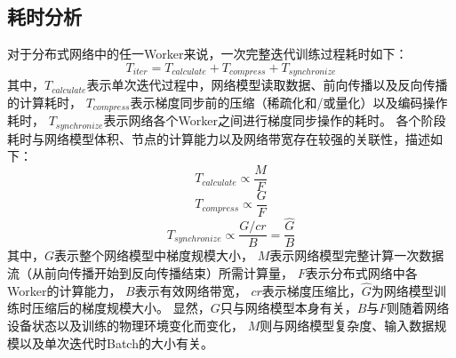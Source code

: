 \documentclass{xdupgthesis}
\begin{document}
\subsection{耗时分析}
对于分布式网络中的任一Worker来说，一次完整迭代训练过程耗时如下：
\begin{equation}
    T_{iter} = 
        T_{calculate} + T_{compress} + T_{synchronize}
    \label{eq_Time-iter}
\end{equation}
其中，$T_{calculate}$表示单次迭代过程中，网络模型读取数据、前向传播以及反向传播的计算耗时，
$T_{compress}$表示梯度同步前的压缩（稀疏化和/或量化）以及编码操作耗时，
$T_{synchronize}$表示网络各个Worker之间进行梯度同步操作的耗时。
各个阶段耗时与网络模型体积、节点的计算能力以及网络带宽存在较强的关联性，描述如下：
\begin{equation}
    T_{calculate} \propto \frac{M}{F}
\end{equation}
\begin{equation}
    T_{compress} \propto \frac{G}{F}
\end{equation}
\begin{equation}
    T_{synchronize} \propto \frac{G/cr}{B} = \frac{\hat{G}}{B}
\end{equation}
其中，$G$表示整个网络模型中梯度规模大小，
$M$表示网络模型完整计算一次数据流（从前向传播开始到反向传播结束）所需计算量，
$F$表示分布式网络中各Worker的计算能力，
$B$表示有效网络带宽，
$cr$表示梯度压缩比，$\hat{G}$为网络模型训练时压缩后的梯度规模大小。
显然，$G$只与网络模型本身有关，$B$与$F$则随着网络设备状态以及训练的物理环境变化而变化，
$M$则与网络模型复杂度、输入数据规模以及单次迭代时Batch的大小有关。
\end{document}
